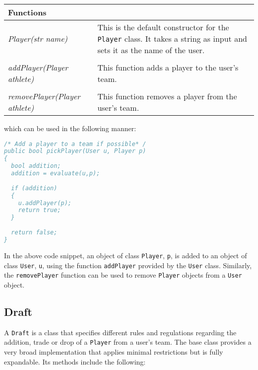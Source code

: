\documentclass[12pt]{report}
\begin{document}
\begin{flushleft}
\begin{singlespace}
\begin{tabular}{ p{5.5cm} | p{10cm} }
\hline
\textbf{Functions} & \\
\hline
\textit{Player(str name)} & This is the default constructor for the \texttt{Player} class. It takes a string as input and sets it as the name of the user. \\
\\
\textit{addPlayer(Player athlete)} & This function adds a player to the user's team. \\
\\
\textit{removePlayer(Player athlete)} & This function removes a player from the user's team. \\
\hline
\end{tabular}
\end{singlespace}
\end{flushleft}

which can be used in the following manner:

\begin{singlespace}
\begin{lstlisting}[language=Java,label=some-code,caption=Adding a Player]
/* Add a player to a team if possible* /
public bool pickPlayer(User u, Player p)
{
  bool addition;
  addition = evaluate(u,p);
  
  if (addition)
  {
    u.addPlayer(p);
    return true;
  }
  
  return false;
}
\end{lstlisting}
\end{singlespace}

In the above code snippet, an object of class \texttt{Player}, \texttt{p}, is added to an object of class \texttt{User}, \texttt{u}, using the function \texttt{addPlayer} provided by the \texttt{User} class. Similarly, the \texttt{removePlayer} function can be used to remove \texttt{Player} objects from a \texttt{User} object.

\subsection{Draft}

A \texttt{Draft} is a class that specifies different rules and regulations regarding the addition, trade or drop of a \texttt{Player} from a user's team. The base class provides a very broad implementation that applies minimal restrictions but is fully expandable. Its methods include the following:
\end{document}
